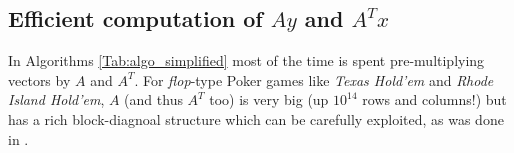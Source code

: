 \documentclass{article} %
\DeclareMathOperator{\proj}{proj}
\DeclareMathOperator{\prox}{Prox}
\begin{document}
\subsection{Efficient computation of $Ay$ and $A^Tx$}
In Algorithms \ref{Tab:algo_simplified} most of the time is spent
pre-multiplying vectors by $A$ and $A^T$. For \textit{flop}-type Poker
games like \textit{Texas Hold'em} and  \textit{Rhode Island Hold'em},
$A$ (and thus $A^T$ too)  is very big (up $10^{14}$ rows and columns!)
but has a rich block-diagnoal structure which can be carefully
exploited, as was done in \cite{hoda2010smoothing}.
\end{document}
